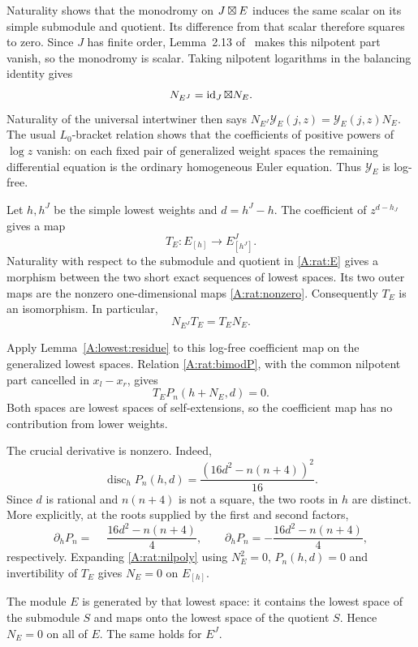 \documentclass[11pt]{article}
\numberwithin{equation}{section}
\begin{document}
Naturality shows that the monodromy on $J\boxtimes E$ induces the same scalar on its simple submodule and quotient. Its difference from that scalar therefore squares to zero. Since $J$ has finite order, Lemma~2.13 of~\cite{A:CKL} makes this nilpotent part vanish, so the monodromy is scalar. Taking nilpotent logarithms in the balancing identity gives
\begin{equation}\label{A:rat:Ntransport}
 N_{E^J}=\operatorname{id}_J\boxtimes N_E.
\end{equation}
Naturality of the universal intertwiner then says
$N_{E^J}\mathcal Y_E(j,z)=\mathcal Y_E(j,z)N_E$.
The usual $L_0$-bracket relation shows that the coefficients of positive powers of $\log z$ vanish: on each fixed pair of generalized weight spaces the remaining differential equation is the ordinary homogeneous Euler equation. Thus $\mathcal Y_E$ is log-free.

Let $h,h^J$ be the simple lowest weights and $d=h^J-h$. The coefficient of $z^{d-h_J}$ gives a map
\[
 T_E:E_{[h]}\longrightarrow E^J_{[h^J]}.
\]
Naturality with respect to the submodule and quotient in \eqref{A:rat:E} gives a morphism between the two short exact sequences of lowest spaces. Its two outer maps are the nonzero one-dimensional maps \eqref{A:rat:nonzero}. Consequently $T_E$ is an isomorphism. In particular,
\[
 N_{E^J}T_E=T_EN_E.
\]

Apply Lemma~\ref{A:lowest:residue} to this log-free coefficient map on the generalized lowest spaces. Relation \eqref{A:rat:bimodP}, with the common nilpotent part cancelled in $x_l-x_r$, gives
\begin{equation}\label{A:rat:nilpoly}
 T_E P_n(h+N_E,d)=0.
\end{equation}
Both spaces are lowest spaces of self-extensions, so the coefficient map has no contribution from lower weights.

The crucial derivative is nonzero. Indeed,
\[
 \operatorname{disc}_{h}P_n(h,d)
       =\frac{(16d^2-n(n+4))^2}{16}.
\]
Since $d$ is rational and $n(n+4)$ is not a square, the two roots in $h$ are distinct. More explicitly, at the roots supplied by the first and second factors,
\begin{equation}\label{A:rat:deriv}
 \partial_hP_n=\phantom{-}\frac{16d^2-n(n+4)}4,
 \qquad
 \partial_hP_n=-\frac{16d^2-n(n+4)}4,
\end{equation}
respectively. Expanding \eqref{A:rat:nilpoly} using $N_E^2=0$, $P_n(h,d)=0$ and invertibility of $T_E$ gives $N_E=0$ on $E_{[h]}$.

The module $E$ is generated by that lowest space: it contains the lowest space of the submodule $S$ and maps onto the lowest space of the quotient $S$. Hence $N_E=0$ on all of $E$. The same holds for $E^J$.
\end{document}
